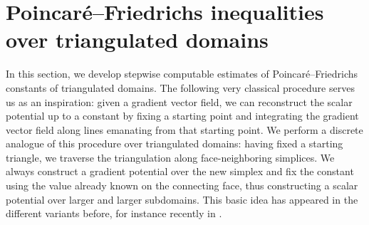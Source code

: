 \documentclass[10pt,a4paper]{article}
\newcommand\cye[1]{%
\protect\leavevmode
\begingroup
    \color{blue}%
    #1%
\endgroup
}
\begin{document}
\section{Poincar\'e--Friedrichs inequalities over triangulated domains}\label{section:gradient}

In this section, we develop stepwise computable estimates of Poincar\'e--Friedrichs constants of triangulated domains. 
The following very classical procedure serves us as an inspiration: given a gradient vector field, we can reconstruct the scalar potential up to a constant by fixing a starting point and integrating the gradient vector field along lines emanating from that starting point. 
We perform a discrete analogue of this procedure over triangulated domains: 
having fixed a starting triangle, we traverse the triangulation along face-neighboring simplices.
We always construct a gradient potential over the new simplex and fix the constant using the value already known on the connecting face, thus constructing a scalar potential over larger and larger subdomains.
This basic idea has appeared in the different variants before, for instance recently in \cite{Brae_Pill_Sch_p_rob_09, ern2020stable, Chaum_Voh_p_rob_3D_H_curl_24, Voh_loc_glob_H1_24}.



% 
\end{document}
